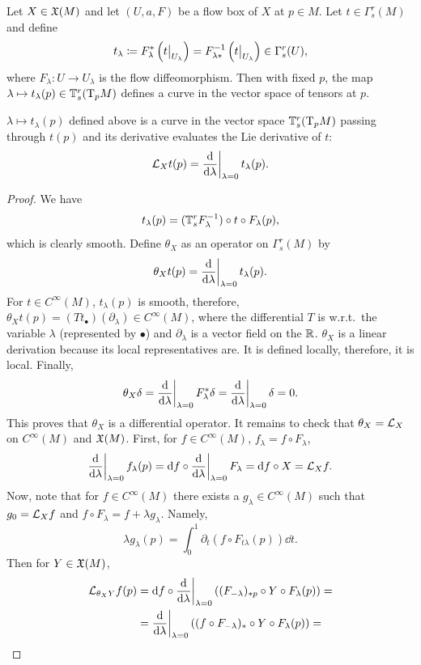 Let $X\in \mathfrak{X}(M)$ and let $(U,a,F)$ be a flow box of $X$ at $p\in M$. Let $t\in\Gamma^r_s(M)$ and define
\[t_\lambda\coloneqq F_{\lambda}^\ast \left(\restr{t}{U_\lambda}\right)=F_{\lambda\ast}^{-1} \left(\restr{t}{U_\lambda}\right)\in\Gamma^r_s(U),\]
where $F_\lambda :U\to U_\lambda$ is the flow diffeomorphism. Then with fixed $p$, the map $\lambda\mapsto t_\lambda (p) \in \mathbb{T}^r_s (\mathrm{T}_p M)$ defines a curve in the vector space of tensors at $p$.
\begin{thm}
    $\lambda\mapsto t_\lambda (p)$ defined above is a curve in the vector space $\mathbb{T}^r_s (\mathrm{T}_p M)$ passing through $t(p)$ and its derivative evaluates the Lie derivative of $t$:
    \[\Lie_X t(p)=\restr{\frac{\dd}{\dd \lambda}}{\lambda=0}t_\lambda(p).\]
\end{thm}
\begin{proof}
    We have 
    \[t_\lambda(p)=(\mathbb{T}^r_s F_\lambda^{-1})\circ t \circ F_\lambda(p),\] 
    which is clearly smooth.
    Define $\theta_X$ as an operator on $\Gamma^r_s(M)$ by 
    \[\theta_X t(p)=\restr{\frac{\dd}{\dd \lambda}}{\lambda=0} t_\lambda(p).\]
    For $t\in C^\infty(M)$, $t_\lambda(p)$ is smooth, therefore, $\theta_X t(p)=(Tt_\bullet)(\partial_\lambda)\in C^\infty(M)$, where the differential $T$ is w.r.t.\ the variable $\lambda$ (represented by $\bullet$) and  $\partial_\lambda$ is a vector field on the $\mathbb{R} $. $\theta_X$ is a linear derivation because its local representatives are. It is defined locally, therefore, it is local. Finally, 
    \[\theta_X\delta=\restr{\frac{\dd}{\dd \lambda}}{\lambda=0} F^\ast_\lambda \delta=\restr{\frac{\dd}{\dd \lambda}}{\lambda=0}\delta=0.\] 
    This proves that $\theta_X$ is a differential operator. It remains to check that $\theta_X=\mathcal{L}_X$ on $C^\infty(M)$ and $\mathfrak{X}(M)$. First, for $f\in C^\infty(M)$, 
    $f_\lambda=f\circ F_\lambda$, 
    \[\restr{\frac{\dd}{\dd \lambda}}{\lambda=0}f_\lambda(p)=\dd f\circ \restr{\frac{\dd}{\dd \lambda}}{\lambda=0}F_\lambda=\dd f\circ X=\Lie_X f.\]
    Now, note that for $f\in C^\infty(M)$ there exists a $g_\lambda\in C^\infty(M)$ such that $g_0=\mathcal{L}_X f$ and $f\circ F_\lambda=f+\lambda g_\lambda$. Namely, 
    \[\lambda g_\lambda (p)=\int_0^1 \partial_t(f\circ F_{t\lambda}(p))\dd t.\] 
    Then for $Y\in\mathfrak{X}(M)$,
    \begin{align}
        \Lie_{\theta_X Y}f(p)&=\dd f\circ \restr{\frac{\dd}{\dd \lambda}}{\lambda=0} \left((F_{-\lambda})_{\ast p}\circ Y\circ F_\lambda(p)\right)=\\
        &=\restr{\frac{\dd}{\dd \lambda}}{\lambda=0}\left((f\circ F_{-\lambda})_\ast\circ Y\circ F_\lambda(p)\right)=\\

\end{align}
\end{proof}
